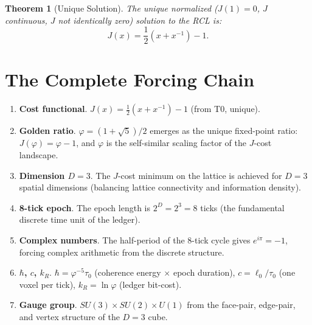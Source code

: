 \documentclass[12pt,a4paper]{article}
\newtheorem{theorem}{Theorem}[section]
\theoremstyle{definition}
\theoremstyle{remark}
\begin{document}
\begin{theorem}[Unique Solution]
\label{thm:unique}
The unique normalized ($J(1) = 0$, $J$ continuous, $J$ not
identically zero) solution to the RCL is:
\begin{equation}
  J(x) = \frac{1}{2}\!\left(x + x^{-1}\right) - 1.
\end{equation}
\end{theorem}

\section{The Complete Forcing Chain}
\label{sec:chain}

\begin{enumerate}[label=\textbf{T\arabic*}., leftmargin=2cm]

  \item \textbf{Cost functional}.
  $J(x) = \tfrac{1}{2}(x + x^{-1}) - 1$ (from T0, unique).

  \item \textbf{Golden ratio}.
  $\varphi = (1+\sqrt{5})/2$ emerges as the unique fixed-point
  ratio: $J(\varphi) = \varphi - 1$, and $\varphi$ is the
  self-similar scaling factor of the $J$-cost landscape.

  \item \textbf{Dimension $D = 3$}.
  The $J$-cost minimum on the lattice is achieved for $D = 3$
  spatial dimensions (balancing lattice connectivity and
  information density).

  \item \textbf{8-tick epoch}.
  The epoch length is $2^D = 2^3 = 8$ ticks (the fundamental
  discrete time unit of the ledger).

  \item \textbf{Complex numbers}.
  The half-period of the 8-tick cycle gives $e^{i\pi} = -1$,
  forcing complex arithmetic from the discrete structure.

  \item \textbf{$\hbar$, $c$, $k_R$}.
  $\hbar = \varphi^{-5}\tau_0$ (coherence energy $\times$
  epoch duration), $c = \ell_0/\tau_0$ (one voxel per tick),
  $k_R = \ln\varphi$ (ledger bit-cost).

  \item \textbf{Gauge group}.
  $SU(3) \times SU(2) \times U(1)$ from the face-pair,
  edge-pair, and vertex structure of the $D = 3$ cube.


\end{enumerate}
\end{document}
